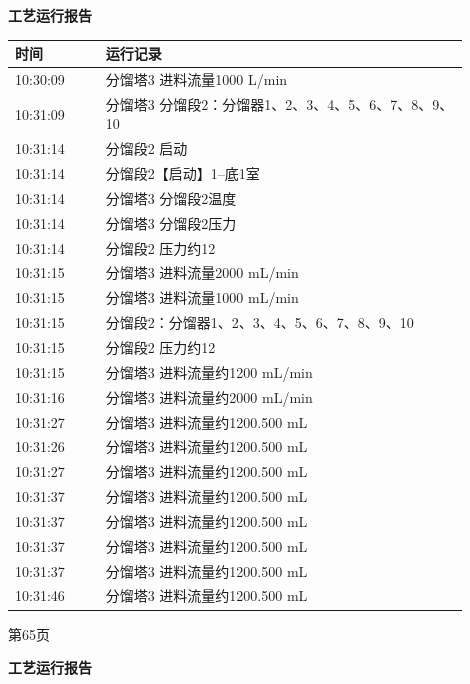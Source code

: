 \documentclass[UTF8,10pt,a4paper,fontset=fandol]{ctexart}
\begin{document}
\newpage

\begin{center}
\begin{minipage}[t]{0.47\linewidth}
\centering
\textbf{工艺运行报告}

\smallskip
\begin{tabular}{|p{0.18\linewidth}|p{0.72\linewidth}|}
\hline
时间 & 运行记录 \\ \hline
10:30:09 & 分馏塔3 进料流量1000 L/min \\ \hline
10:31:09 & 分馏塔3 分馏段2：分馏器1、2、3、4、5、6、7、8、9、10 \\ \hline
10:31:14 & 分馏段2 启动 \\ \hline
10:31:14 & 分馏段2【启动】1--底1室 \\ \hline
10:31:14 & 分馏塔3 分馏段2温度 \\ \hline
10:31:14 & 分馏塔3 分馏段2压力 \\ \hline
10:31:14 & 分馏段2 压力约12 \\ \hline
10:31:15 & 分馏塔3 进料流量2000 mL/min \\ \hline
10:31:15 & 分馏塔3 进料流量1000 mL/min \\ \hline
10:31:15 & 分馏段2：分馏器1、2、3、4、5、6、7、8、9、10 \\ \hline
10:31:15 & 分馏段2 压力约12 \\ \hline
10:31:15 & 分馏塔3 进料流量约1200 mL/min \\ \hline
10:31:16 & 分馏塔3 进料流量约2000 mL/min \\ \hline
10:31:27 & 分馏塔3 进料流量约1200.500 mL \\ \hline
10:31:26 & 分馏塔3 进料流量约1200.500 mL \\ \hline
10:31:27 & 分馏塔3 进料流量约1200.500 mL \\ \hline
10:31:37 & 分馏塔3 进料流量约1200.500 mL \\ \hline
10:31:37 & 分馏塔3 进料流量约1200.500 mL \\ \hline
10:31:37 & 分馏塔3 进料流量约1200.500 mL \\ \hline
10:31:37 & 分馏塔3 进料流量约1200.500 mL \\ \hline
10:31:46 & 分馏塔3 进料流量约1200.500 mL \\ \hline
\end{tabular}

\smallskip
第65页
\end{minipage}
\hfill
\begin{minipage}[t]{0.47\linewidth}
\centering
\textbf{工艺运行报告}


\end{minipage}
\end{center}
\end{document}
